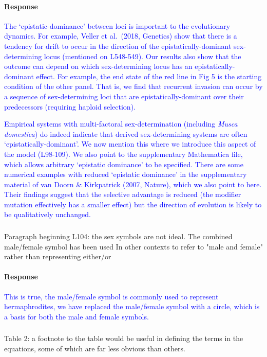 \documentclass[10pt,letterpaper]{article}
\begin{document}
\noindent\paragraph{Response}
\textcolor{blue}{
The `epistatic-dominance' between loci is important to the evolutionary dynamics. For example, Veller et al.\ (2018, Genetics) show that there is a tendency for drift to occur in the direction of the epistatically-dominant sex-determining locus (mentioned on L548-549). Our results also show that the outcome can depend on which sex-determining locus has an epistatically-dominant effect. For example, the end state of the red line in Fig 5 is the starting condition of the other panel. That is, we find that recurrent invasion can occur by a sequence of sex-determining loci that are epistatically-dominant over their predecessors (requiring haploid selection). 
 }
 
\textcolor{blue}{
Empirical systems with multi-factoral sex-determination (including \textit{Musca domestica}) do indeed indicate that derived sex-determining systems are often `epistatically-dominant'. 
We now mention this where we introduce this aspect of the model (L98-109). 
We also point to the supplementary Mathematica file, which allows arbitrary `epistatic dominance' to be specified. 
There are some numerical examples with reduced `epistatic dominance' in the supplementary material of van Doorn \& Kirkpatrick (2007, Nature), which we also point to here.
Their findings suggest that the selective advantage is reduced (the modifier mutation effectively has a smaller effect) but the direction of evolution is likely to be qualitatively unchanged. 
}

\noindent\subsubsection{}
Paragraph beginning L104: the sex symbols are not ideal. The combined male/female symbol has been used In other contexts to refer to "male and female" rather than representing either/or

\noindent\paragraph{Response}
\textcolor{blue}{This is true, the male/female symbol is commonly used to represent hermaphrodites, we have replaced the male/female symbol with a circle, which is a basis for both the male and female symbols.}

\noindent\subsubsection{}
Table 2: a footnote to the table would be useful in defining the terms in the equations, some of which are far less obvious than others.
\end{document}
